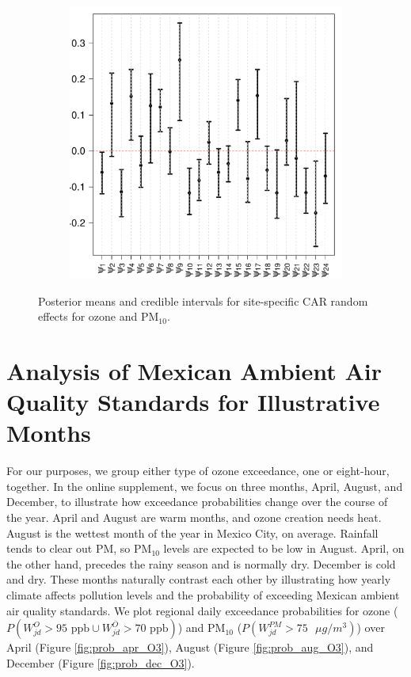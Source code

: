 \documentclass[alpha-refs]{wiley-article}
\begin{document}
\begin{figure}[H]
\begin{center}
\begin{subfigure}[b]{.35\textwidth}
     \includegraphics[width=\textwidth]{psi2}
   \end{subfigure}
  \end{center}
  \vspace{-4mm}
       \caption{Posterior means and credible intervals for site-specific CAR random effects for ozone and $\text{PM}_{10}$. }\label{fig:post_car_box}
\end{figure}

\section{Analysis of Mexican Ambient Air Quality Standards for Illustrative Months}

 For our purposes, we group either type of ozone exceedance, one or eight-hour, together. In the online supplement, we focus on three months, April, August, and December, to illustrate how exceedance probabilities change over the course of the year. April and August are warm months, and ozone creation needs heat. August is the wettest month of the year in Mexico City, on average. Rainfall tends to clear out PM, so $\text{PM}_{10}$ levels are expected to be low in August. April, on the other hand, precedes the rainy season and is normally dry. December is cold and dry. These months naturally contrast each other by illustrating how yearly climate affects pollution levels and the probability of exceeding Mexican ambient air quality standards. We plot regional daily exceedance probabilities for ozone ($P(W_{jd}^O > 95 \text{ ppb} \cup W_{jd}^{\overline{O}} > 70 \text{ ppb})$) and $\text{PM}_{10}$ ($P(W_{jd}^{PM} > 75 \text{ }\mu g / m^3)$) over April (Figure \ref{fig:prob_apr_O3}), August (Figure \ref{fig:prob_aug_O3}), and December (Figure \ref{fig:prob_dec_O3}).  
\end{document}
